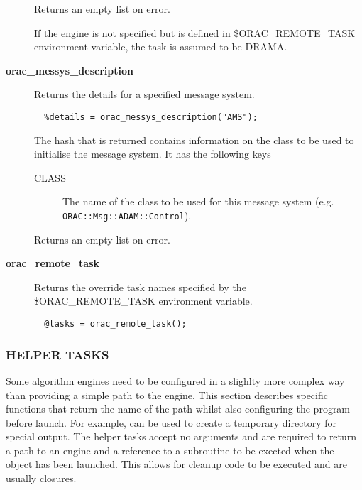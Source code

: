 \begin{description}
Returns an empty list on error.



If the engine is not specified but is defined in \$ORAC\_REMOTE\_TASK
environment variable, the task is assumed to be DRAMA.


\item[{\textbf{orac\_messys\_description}}] \mbox{}

Returns the details for a specified message system.

\begin{verbatim}
  %details = orac_messys_description("AMS");
\end{verbatim}


The hash that is returned contains information on the
class to be used to initialise the message system.
It has the following keys

\begin{description}

\item[{CLASS}] \mbox{}

The name of the class to be used for this message system
(e.g. \texttt{ORAC::Msg::ADAM::Control}).

\end{description}


Returns an empty list on error.


\item[{\textbf{orac\_remote\_task}}] \mbox{}

Returns the override task names specified by the \$ORAC\_REMOTE\_TASK
environment variable.

\begin{verbatim}
  @tasks = orac_remote_task();
\end{verbatim}
\end{description}
\subsubsection*{HELPER TASKS\label{ORAC::Inst::Defn_HELPER_TASKS}}


Some algorithm engines need to be configured in a slighlty more complex
way than providing a simple path to the engine. This section
describes specific functions that return the name of the path whilst
also configuring the program before launch. For example, can be used
to create a temporary directory for special output. The helper tasks
accept no arguments and are required to return a path to an
engine and a reference to a subroutine to be exected when the
object has been launched. This allows for cleanup code to be executed
and are usually closures.

